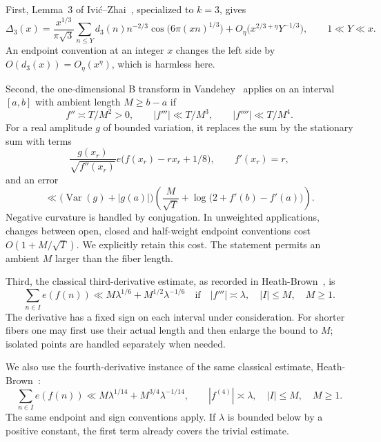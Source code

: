 \documentclass[11pt,a4paper]{article}
\numberwithin{equation}{section}
\theoremstyle{remark}
\DeclareMathOperator{\Var}{Var}
\begin{document}
First, Lemma~3 of Ivi\'c--Zhai~\cite{IZ}, specialized to $k=3$, gives
\begin{equation}\label{eq:voronoi}
 \Delta_3(x)=\frac{x^{1/3}}{\pi\sqrt3}
 \sum_{n\le Y}d_3(n)n^{-2/3}
       \cos\bigl(6\pi(xn)^{1/3}\bigr)
 +O_\eta\bigl(x^{2/3+\eta}Y^{-1/3}\bigr),
 \qquad 1\ll Y\ll x.
\end{equation}
An endpoint convention at an integer $x$ changes the left side by
$O(d_3(x))=O_\eta(x^\eta)$, which is harmless here.

Second, the one-dimensional B transform in Vandehey~\cite[Theorem~1.1]{Vand}
applies on an interval $[a,b]$ with ambient length $M\ge b-a$ if
\[
 f''\asymp T/M^2>0,\qquad
 |f'''|\ll T/M^3,\qquad |f''''|\ll T/M^4.
\]
For a real amplitude $g$ of bounded variation, it replaces the sum by the
stationary sum with terms
\[
 \frac{g(x_r)}{\sqrt{f''(x_r)}}
 e\bigl(f(x_r)-rx_r+1/8\bigr),\qquad f'(x_r)=r,
\]
and an error
\begin{equation}\label{eq:one-B-error}
 \ll \bigl(\Var(g)+|g(a)|\bigr)
 \left(\frac{M}{\sqrt T}
 +\log\bigl(2+f'(b)-f'(a)\bigr)\right).
\end{equation}
Negative curvature is handled by conjugation. In unweighted applications,
changes between open, closed and half-weight endpoint conventions cost
$O(1+M/\sqrt T)$. We explicitly retain this cost. The statement permits an
ambient $M$ larger than the fiber length.

Third, the classical third-derivative estimate, as recorded in
Heath-Brown~\cite[equation~(1), $k=3$]{HB}, is
\begin{equation}\label{eq:third-test}
 \sum_{n\in I}e(f(n))
 \ll M\lambda^{1/6}+M^{1/2}\lambda^{-1/6}
 \quad\text{if}\quad |f'''|\asymp\lambda,
 \quad |I|\le M,\quad M\ge1.
\end{equation}
The derivative has a fixed sign on each interval under consideration. For
shorter fibers one may first use their actual length and then enlarge the
bound to $M$; isolated points are handled separately when needed.

We also use the fourth-derivative instance of the same classical estimate,
Heath-Brown~\cite[equation~(1), $k=4$]{HB}:
\begin{equation}\label{eq:fourth-test}
 \sum_{n\in I}e(f(n))
 \ll M\lambda^{1/14}+M^{3/4}\lambda^{-1/14},
 \qquad |f^{(4)}|\asymp\lambda,\quad |I|\le M,\quad M\ge1.
\end{equation}
The same endpoint and sign conventions apply. If $\lambda$ is bounded below
by a positive constant, the first term already covers the trivial estimate.
\end{document}
